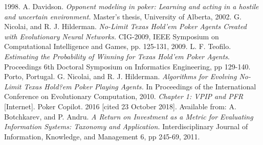 \begin{thebibliography}{9}
  1998.
  A. Davidson.
  \textit{Opponent modeling in poker: Learning and acting in a hostile and uncertain environment.}
   Master’s thesis, University of Alberta, 
  2002.
G. Nicolai, and R. J. Hilderman.
\textit{No-Limit Texas Hold'em Poker Agents Created with Evolutionary Neural Networks.}
CIG-2009, IEEE Symposium on Computational Intelligence and Games, pp. 125-131, 2009.
L. F. Teofilo.
\textit{Estimating the Probability of Winning for Texas Hold'em Poker Agents}.
Proceedings 6th Doctoral Symposium on Informatics Engineering, pp 129-140. Porto, Portugal.
G. Nicolai, and R. J. Hilderman.
\textit{Algorithms for Evolving No-Limit Texas Hold?em Poker Playing Agents.}
In Proceedings of the International Conference on Evolutionary Computation, 2010.
\textit{Chapter 1: VPIP and PFR} [Internet]. Poker Copilot. 2016 [cited 23 October 2018]. Available from: \href{https://pokercopilot.com/poker-statistics/vpip-pfr}{} 
A. Botchkarev, and P. Andru.
\textit{A Return on Investment as a Metric for Evaluating Information Systems: Taxonomy and Application.}  Interdisciplinary Journal of Information, Knowledge, and Management 6, pp 245-69, 2011.
\end{thebibliography}

